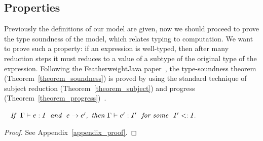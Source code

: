 \subsection{Properties}
Previously the definitions of our model are given, now we should proceed to prove the type soundness of 
the model, which relates typing to computation. We want to prove such a property: if an expression is 
well-typed, then after many reduction steps it must reduces to a value of a subtype of the original type
of the expression. Following the FeatherweightJava paper~\cite{Igarashi01FJ}, the type-soundness theorem 
(Theorem~\ref{theorem_soundness}) is proved by using the standard technique of subject reduction (Theorem~\ref{theorem_subject})
and progress (Theorem~\ref{theorem_progress})~\cite{Wright1994}.

\begin{theorem}~\label{theorem_subject}
$\textit{If } \ \judgeewf \Gamma {e : I} \; \textit{ and } \ e \rightarrow e',\ 
\textit{then } \judgeewf \Gamma {e' : I'} \ \textit{ for some } \ I' <: I.$
\end{theorem}
\begin{proof}
See Appendix~\ref{appendix_proof}.
\end{proof}


